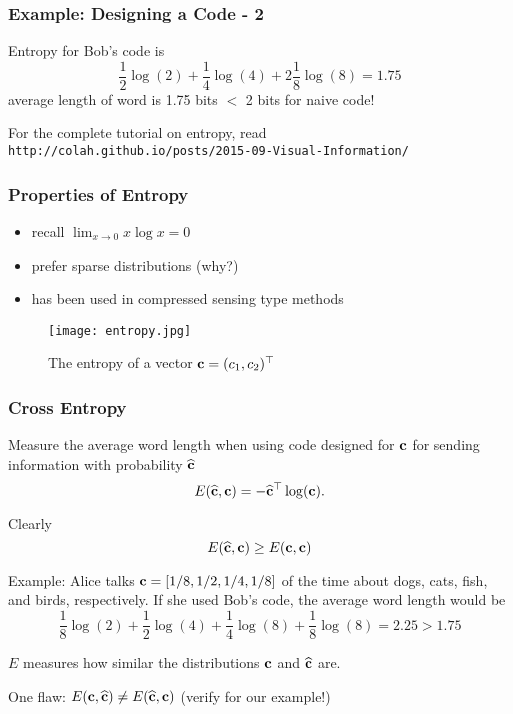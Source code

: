 \documentclass[12pt,fleqn,handout]{beamer}
\begin{document}
\begin{frame}
	\frametitle{Example: Designing a Code - 2}

	Entropy for Bob's code is
	$$
		\frac{1}{2} \log\left(2\right) + \frac{1}{4} \log\left(4\right) + 2 \frac{1}{8} \log\left(8\right) = 1.75
	$$
	average length of word is 1.75 bits $<$ 2 bits for naive code!
	
\bigskip


\bigskip
\pause

For the complete tutorial on entropy, read
{\small
\tt{http://colah.github.io/posts/2015-09-Visual-Information/}
}

\end{frame}

\begin{frame}
	\frametitle{Properties of Entropy}

\begin{itemize}
\item recall $\lim_{x\rightarrow 0} x \log x = 0$
\item prefer sparse distributions (why?)
\item has been used in compressed sensing type methods
\end{itemize}

\begin{center}
\begin{figure}
\texttt{[image: entropy.jpg]}
\caption{The entropy of a vector ${\bf c} = (c_1, c_2)^\top$}
\end{figure}
\end{center}


\end{frame}

\begin{frame}
	\frametitle{Cross Entropy}


Measure the average word length when using code designed for ${\bf c}$ for sending information with probability $\widehat {{\bf c}}$
$$ E(\widehat{{\bf c}}, {\bf c}) = - {\widehat {{\bf c}}}^{\top} \log({\bf c}). $$

\bigskip

Clearly
$$ E(\widehat{{\bf c}},  {\bf c}) \ge E({\bf c}, {\bf c}) $$

\bigskip
\pause

Example: Alice talks ${\bf c} = [1/8,1/2,1/4,1/8]$ of the time about dogs, cats, fish, and birds, respectively.
If she used Bob's code, the average word length would be 
$$
	\frac{1}{8} \log\left(2\right) + \frac{1}{2} \log\left(4\right) + \frac{1}{4} \log\left(8\right) + \frac{1}{8} \log\left(8\right) = 2.25 > 1.75
$$

\bigskip
\pause

$E$ measures how similar the distributions ${\bf c}$ and $\widehat {{\bf c}}$ are.


\bigskip
\pause

One flaw: $ E({\bf c}, \widehat {{\bf c}}) \not= E(\widehat {{\bf c}}, {\bf c})$ (verify for our example!)


\end{frame}
\end{document}
